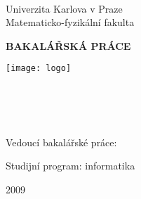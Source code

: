 \begin{titlepage}
\begin{center}
\ \\

\vspace{15mm}

\large
Univerzita Karlova v Praze\\
Matematicko-fyzikální fakulta\\

\vspace{5mm}

{\Large\bf BAKALÁŘSKÁ PRÁCE}

\vspace{10mm}

\texttt{[image: logo]} 

\vspace{15mm}

{\Large \bcAuthor}\\ %
\vspace{5mm}
{\Large\bf \bcTitle}\\ %
\vspace{5mm}
\bcKSVI\\ %
\end{center}
\vspace{15mm}

\large
\noindent Vedoucí bakalářské práce: \bcTeacher %
\vspace{1mm} 

\noindent Studijní program: informatika %

\vspace{20mm}

\begin{center}
2009 %
\end{center}

\end{titlepage} %
\clearpage

